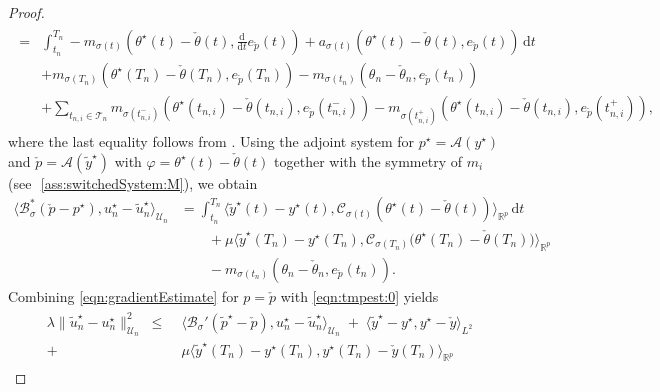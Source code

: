 \documentclass[reqno]{amsart}
\newcommand{\U}{{\mathscr U}}
\newcommand{\R}{\mathbb R}
\newcommand{\state}{\theta}
\newcommand{\adState}{p}
\newcommand{\inpVar}{u}
\newcommand{\outVar}{y}
\newcommand{\outVarDim}{p}
\newcommand{\dt}{\,\mathrm{d}t}
\newcommand{\ddt}{\tfrac{\mathrm{d}}{\mathrm{d}t}}
\newcommand{\bOper}{\calB}
\newcommand{\cOper}{\calC}
\newcommand{\solA}{\mathcal{A}}
\newcommand{\intermediateInitState}{\intermediateState_n}%
\newcommand{\optState}{\state^\star}
\newcommand{\optAdState}{\adState^\star}
\newcommand{\optInpVar}[1]{\inpVar_{#1}^\star}
\newcommand{\optInpVarN}{\optInpVar{n}}
\newcommand{\optOutVar}{\outVar^\star}
\newcommand{\switch}{\sigma}
\newcommand{\reduce}[1]{\tilde{#1}}
\newcommand{\adStateRed}{\reduce{\adState}}
\newcommand{\outVarRed}{\reduce{\outVar}}
\newcommand{\optAdStateRed}{\adStateRed^\star}
\newcommand{\optInpVarRed}[1]{\reduce{\inpVar}_{#1}^\star}
\newcommand{\optInpVarRedN}{\optInpVarRed{n}}
\newcommand{\optOutVarRed}{\outVarRed^\star}
\newcommand{\intermediateState}{\check{\state}}
\newcommand{\intermediateAdStateB}{\check{\adState}}
\newcommand{\intermediateOutVar}{\check{\outVar}}
\newcommand{\calB}{\mathcal{B}}
\newcommand{\calC}{\mathcal{C}}
\newcommand{\calT}{\mathcal{T}}
\begin{document}
\begin{proof}
\begin{align}
\begin{aligned}
    =& \int_{t_n}^{T_n} -m_{\switch(t)}\left(\optState(t)-\check{\state}(t), \ddt e_{\intermediateAdStateB}(t)\right) + a_{\switch(t)}(\optState(t) - \check{\state}(t), e_{\intermediateAdStateB}(t)) \dt\\
		&+ m_{\switch(T_n)}(\optState(T_n) - \intermediateState(T_n), e_{\intermediateAdStateB}(T_n))-m_{\switch(t_n)}(\state_{n} - \intermediateInitState, e_{\intermediateAdStateB}(t_n))\\
     &+\sum_{t_{n,i}\in\calT_n}m_{\switch(t^{-}_{n,i})}(\optState(t_{n,i}) - \intermediateState(t_{n,i}),e_{\intermediateAdStateB}(t_{n,i}^-))-m_{\switch(t^{+}_{n,i})}(\optState(t_{n,i}) - \intermediateState(t_{n,i}),e_{\intermediateAdStateB}(t_{n,i}^+)),
     \end{aligned}
	\end{align}
	where the last equality follows from . Using the adjoint system for $\optAdState=\solA(\optOutVar)$ and $\intermediateAdStateB=\solA(\optOutVarRed)$ with $\varphi=\optState(t)-\intermediateState(t)$ together with the symmetry of $m_i$ (see~\,\ref{ass:switchedSystem:M}), we obtain
	\begin{equation}\label{eqn:tmpest:0}
	\begin{aligned}
		\langle \bOper_{\switch}^*(\intermediateAdStateB-\optAdState), \optInpVarN-\optInpVarRedN \rangle_{\U_n} &= \int_{t_n}^{T_n} \langle \optOutVarRed(t) - \optOutVar(t), \cOper_{\switch(t)}(\optState(t)-\intermediateState(t))\rangle_{\R^{\outVarDim}} \dt\\
		&\qquad + \mu \langle \optOutVarRed(T_n) - \optOutVar(T_n), \cOper_{\switch(T_n)}\big(\optState(T_n) - \intermediateState(T_n)\big)\rangle_{\R^{\outVarDim}}\\
  &\qquad -m_{\switch(t_n)}(\state_{n} - \intermediateInitState, e_{\intermediateAdStateB}(t_n)).
	\end{aligned}
	\end{equation}
    Combining \eqref{eqn:gradientEstimate} for $p=\intermediateAdStateB$ with \eqref{eqn:tmpest:0} yields
    \begin{align} \label{eqn:tmpest:5}
    \begin{aligned}
		\lambda \|\optInpVarRedN - \optInpVarN\|^2_{\U_n} 
		 \;\leq & \; \langle \bOper_{\switch}'(\optAdStateRed-\intermediateAdStateB), \optInpVarN-\optInpVarRedN \rangle_{\U_n} \; + \;\langle\optOutVarRed- \optOutVar, \optOutVar-\intermediateOutVar\rangle_{L^2}\\ 
        +&\;\mu\langle  \optOutVarRed(T_n)- \optOutVar(T_n), \optOutVar(T_n)-\intermediateOutVar(T_n)\rangle_{\R^{\outVarDim}}

\end{aligned}
\end{align}
\end{proof}
\end{document}
